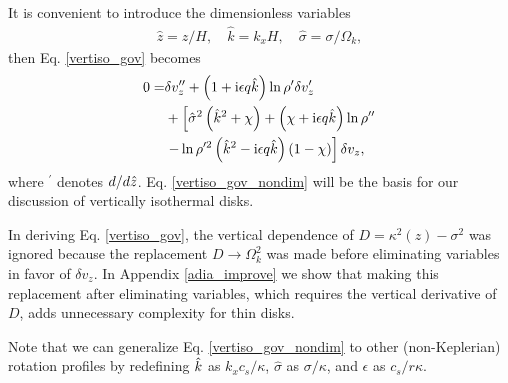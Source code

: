 It is convenient to introduce the dimensionless variables
\begin{align}
  \hat{z} = z/H,\quad \hat{k}=k_xH, \quad \hat{\sigma} = \sigma/\Omega_k,
\end{align}
then Eq. \ref{vertiso_gov} becomes
\begin{align}
  0=& \delta v_z ^{\prime\prime} + \left(1 + \mathrm{i}\epsilon
    q\hat{k}\right)\ln\rho^{\prime}\delta v_z^\prime \notag\\
  &+
  \left[\hat{\sigma}^2\left(\hat{k}^2+\chi\right) +
    \left(  \chi + \mathrm{i} \epsilon q\hat{k}\right)\ln\rho^{\prime\prime}\right.
  \notag\\
  &\left.- \ln\rho^{\prime
      2}\left(\hat{k}^2 -
      \mathrm{i}\epsilon
      q\hat{k}\right)\left(1 - \chi\right)\right]\delta v_z,\label{vertiso_gov_nondim}
\end{align}
where $^\prime$ denotes $d/d\hat{z}$. Eq. \ref{vertiso_gov_nondim} will
be the basis for our discussion of vertically isothermal disks. %

In deriving Eq. \ref{vertiso_gov}, the vertical dependence of
$D=\kappa^2(z)-\sigma^2$ was ignored because the replacement
$D\to\Omega_k^2$ was made before eliminating variables in favor of
$\delta v_z$. In Appendix \ref{adia_improve} we show that making this
replacement after eliminating variables, which requires the vertical
derivative of $D$, adds unnecessary complexity for thin disks.  


Note that we can generalize Eq. \ref{vertiso_gov_nondim} to other
(non-Keplerian) rotation profiles by redefining $\hat{k}$
as $k_xc_s/\kappa$, $\hat{\sigma}$ as $\sigma/\kappa$, and 
$\epsilon$ as $c_s/r\kappa$.    



